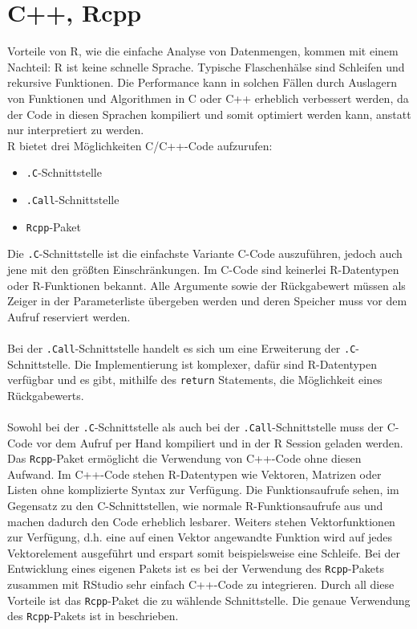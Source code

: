 \section{C++, Rcpp}
\label{kapitel:rcpp}
Vorteile von R, wie die einfache Analyse von Datenmengen, kommen mit einem Nachteil: R ist keine schnelle Sprache. Typische Flaschenhälse sind Schleifen und rekursive Funktionen. Die Performance kann in solchen Fällen durch Auslagern von Funktionen und Algorithmen in C oder C++ erheblich verbessert werden, da der Code in diesen Sprachen kompiliert und somit optimiert werden kann, anstatt nur interpretiert zu werden.\\
R bietet drei Möglichkeiten C/C++-Code aufzurufen:
\begin{itemize}
	\item \texttt{.C}-Schnittstelle
	\item \texttt{.Call}-Schnittstelle
	\item \texttt{Rcpp}-Paket
\end{itemize}
Die \texttt{.C}-Schnittstelle ist die einfachste Variante C-Code auszuführen, jedoch auch jene mit den größten Einschränkungen. Im C-Code sind keinerlei R-Datentypen oder R-Funktionen bekannt. Alle Argumente sowie der Rückgabewert müssen als Zeiger in der Parameterliste übergeben werden und deren Speicher muss vor dem Aufruf reserviert werden.
\\
\\
Bei der \texttt{.Call}-Schnittstelle handelt es sich um eine Erweiterung der \texttt{.C}-Schnittstelle. Die Implementierung ist komplexer, dafür sind R-Datentypen verfügbar und es gibt, mithilfe des \texttt{return} Statements, die Möglichkeit eines Rückgabewerts.
\\
\\
Sowohl bei der \texttt{.C}-Schnittstelle als auch bei der \texttt{.Call}-Schnittstelle muss der C-Code vor dem Aufruf per Hand kompiliert und in der R Session geladen werden. Das \texttt{Rcpp}-Paket ermöglicht die Verwendung von C++-Code ohne diesen Aufwand. Im C++-Code stehen R-Datentypen wie Vektoren, Matrizen oder Listen ohne komplizierte Syntax zur Verfügung. Die Funktionsaufrufe sehen, im Gegensatz zu den C-Schnittstellen, wie normale R-Funktionsaufrufe aus und machen dadurch den Code erheblich lesbarer. Weiters stehen Vektorfunktionen zur Verfügung, d.h. eine auf einen Vektor angewandte Funktion wird auf jedes Vektorelement ausgeführt und erspart somit beispielsweise eine Schleife. Bei der Entwicklung eines eigenen Pakets ist es bei der Verwendung des \texttt{Rcpp}-Pakets zusammen mit RStudio sehr einfach C++-Code zu integrieren. Durch all diese Vorteile ist das \texttt{Rcpp}-Paket die zu wählende Schnittstelle. Die genaue Verwendung des \texttt{Rcpp}-Pakets ist in \cite[S.~395~ff.]{wickham2015advanced} beschrieben.
